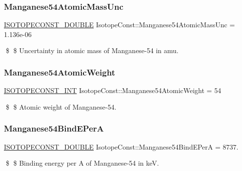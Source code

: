 \subsubsection{\texorpdfstring{Manganese54\+Atomic\+Mass\+Unc}{Manganese54AtomicMassUnc}}
{\footnotesize\ttfamily \mbox{\hyperlink{group___isotope_const-_macros_ga8f45a7272ce02c0b4c65c44636ed719a}{I\+S\+O\+T\+O\+P\+E\+C\+O\+N\+S\+T\+\_\+\+D\+O\+U\+B\+LE}} Isotope\+Const\+::\+Manganese54\+Atomic\+Mass\+Unc = 1.\+136e-\/06}

\$ \$ Uncertainty in atomic mass of Manganese-\/54 in amu. \mbox{\label{group___isotope_const-_manganese-_mn54_gad56b64c9fff57f1149fd7527476c4463}} 
\subsubsection{\texorpdfstring{Manganese54\+Atomic\+Weight}{Manganese54AtomicWeight}}
{\footnotesize\ttfamily \mbox{\hyperlink{group___isotope_const-_macros_ga5f18360b3e99483a35c32d789e62621c}{I\+S\+O\+T\+O\+P\+E\+C\+O\+N\+S\+T\+\_\+\+I\+NT}} Isotope\+Const\+::\+Manganese54\+Atomic\+Weight = 54}

\$ \$ Atomic weight of Manganese-\/54. \mbox{\label{group___isotope_const-_manganese-_mn54_gaf3a9a2904fed3f1a4f99b4153f2af44b}} 
\subsubsection{\texorpdfstring{Manganese54\+Bind\+E\+PerA}{Manganese54BindEPerA}}
{\footnotesize\ttfamily \mbox{\hyperlink{group___isotope_const-_macros_ga8f45a7272ce02c0b4c65c44636ed719a}{I\+S\+O\+T\+O\+P\+E\+C\+O\+N\+S\+T\+\_\+\+D\+O\+U\+B\+LE}} Isotope\+Const\+::\+Manganese54\+Bind\+E\+PerA = 8737.}

\$ \$ Binding energy per A of Manganese-\/54 in keV. \mbox{\label{group___isotope_const-_manganese-_mn54_ga52099c7790e04d50c96822333f279fb0}} 

